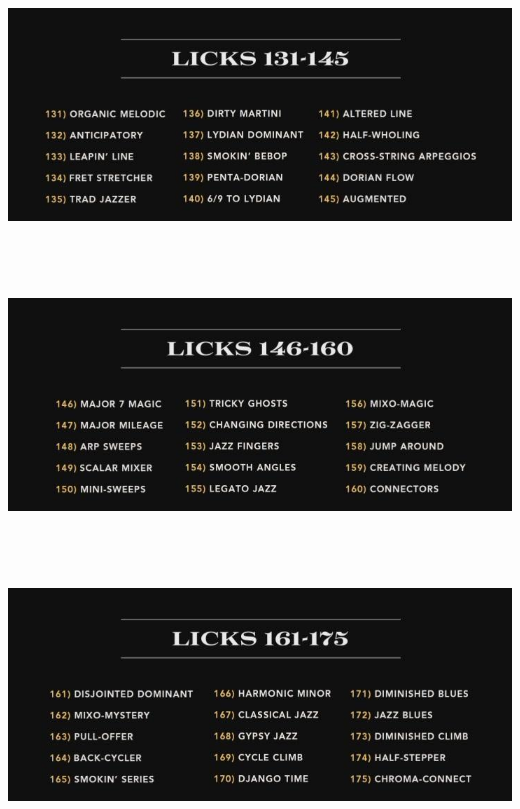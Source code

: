 \documentclass[a4paper]{book}
\begin{document}
\clearpage

\begin{center}
\includegraphics[width=17cm,height=7.177cm]{lebluessupportsmethodes-img40.jpg}
\end{center}


\begin{center}
\includegraphics[width=17cm,height=7.177cm]{lebluessupportsmethodes-img41.jpg}
\end{center}


\begin{center}
\includegraphics[width=17cm,height=7.177cm]{lebluessupportsmethodes-img42.jpg}
\end{center}
\end{document}
